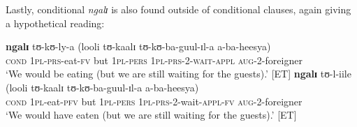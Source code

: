 Lastly, conditional \textit{ngalɪ} is also found outside of conditional clauses, again giving a hypothetical reading:
\begin{exe}
\ex
\gll \textbf{ngalɪ} tʊ-kʊ-ly-a (looli tʊ-kaalɪ tʊ-kʊ-ba-guul-ɪl-a a-ba-heesya)\\
\textsc{cond} 1\textsc{pl}-\textsc{prs}-eat-\textsc{fv} \phantom{(}but 1\textsc{pl}-\textsc{pers} \textsc{1pl}-\textsc{prs}-2-\textsc{wait}-\textsc{appl} \textsc{aug}-2-foreigner\\
\glt \lq We would be eating (but we are still waiting for the guests).' [ET]
\ex
\gll \textbf{ngalɪ} tʊ-l-iile (looli tʊ-kaalɪ tʊ-kʊ-ba-guul-ɪl-a a-ba-heesya)\\
\textsc{cond} \textsc{1pl}-eat-\textsc{pfv}  \phantom{(}but \textsc{1pl}-\textsc{pers} \textsc{1pl}-\textsc{prs}-2-wait-\textsc{appl}-\textsc{fv} \textsc{aug}-2-foreigner\\
\glt \lq We would have eaten (but we are still waiting for the guests).' [ET]
\end{exe}
